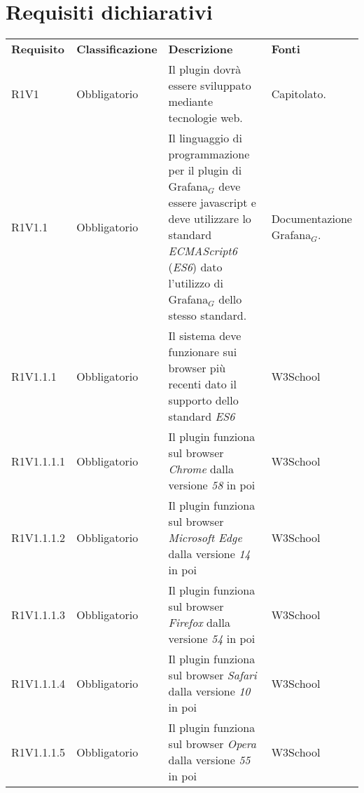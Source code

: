 \documentclass[12pt,a4paper]{article} %
\newcommand\Tstrut{\rule{0pt}{2.6ex}} %
\newcommand\Bstrut{\rule[-0.9ex]{0pt}{0pt}} %
\newcommand{\TBstrut}{\Tstrut\Bstrut} %
\newcommand{\glo}{$_G$} %
\newcommand{\glosp}{$_G$ } %
\begin{document}
\setcounter{secnumdepth}{0}
\section*{Requisiti dichiarativi}
	\begin{longtable} {
		>{\centering}p{18mm} 
		>{\centering}p{28mm}
		>{}p{50mm} 
		>{}p{28mm}
		}
	\rowcolor{gray!50}
		\textbf{Requisito} & 
		\textbf{Classificazione} & 
		\textbf{Descrizione} & 
		\textbf{Fonti} 	\TBstrut \\
		
		R1V1 & 
		Obbligatorio & 
		Il plugin dovrà essere sviluppato mediante tecnologie web. &
		Capitolato.  \TBstrut \\ [2mm]
		
		R1V1.1 & 
		Obbligatorio & 
		Il linguaggio di programmazione per il plugin di Grafana\glosp deve essere javascript e deve utilizzare lo standard \textit{ECMAScript6} (\textit{ES6}) dato l'utilizzo di Grafana\glosp dello stesso standard. &
		Documentazione Grafana\glo.  \TBstrut \\ [2mm]
		
		R1V1.1.1 & 
		Obbligatorio & 
		Il sistema deve funzionare sui browser più recenti dato il supporto dello standard \textit{ES6} &
		W3School  \TBstrut \\ [2mm]
		
		R1V1.1.1.1 & 
		Obbligatorio & 
		Il plugin funziona sul browser \textit{Chrome} dalla versione \textit{58} in poi &
		W3School  \TBstrut \\ [2mm]
		
		R1V1.1.1.2 & 
		Obbligatorio & 
		Il plugin funziona sul browser \textit{Microsoft Edge} dalla versione \textit{14} in poi &
		W3School  \TBstrut \\ [2mm]
		
		R1V1.1.1.3 & 
		Obbligatorio & 
		Il plugin funziona sul browser \textit{Firefox} dalla versione \textit{54} in poi &
		W3School  \TBstrut \\ [2mm]
		
		R1V1.1.1.4 & 
		Obbligatorio & 
		Il plugin funziona sul browser \textit{Safari} dalla versione \textit{10} in poi &
		W3School  \TBstrut \\ [2mm]
		
		R1V1.1.1.5 & 
		Obbligatorio & 
		Il plugin funziona sul browser \textit{Opera} dalla versione \textit{55} in poi &
		W3School  \TBstrut \\ [2mm]
		

\end{longtable}
\end{document}
